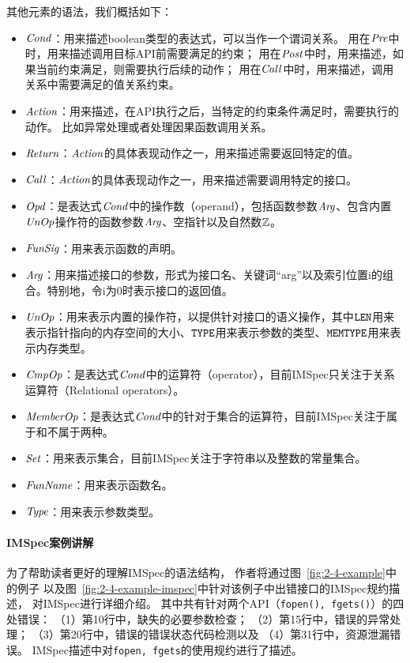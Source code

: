 

其他元素的语法，我们概括如下：
\begin{itemize}
	\item $\mathit{Cond}$：用来描述boolean类型的表达式，可以当作一个谓词关系。
	用在$\mathit{Pre}$中时，用来描述调用目标API前需要满足的约束；
	用在$\mathit{Post}$中时，用来描述，如果当前约束满足，则需要执行后续的动作；
	用在$\mathit{Call}$中时，用来描述，调用关系中需要满足的值关系约束。
	\item $\mathit{Action}$：用来描述，在API执行之后，当特定的约束条件满足时，需要执行的动作。
	比如异常处理或者处理因果函数调用关系。
	\item $\mathit{Return}$：$\mathit{Action}$的具体表现动作之一，用来描述需要返回特定的值。
	\item $\mathit{Call}$：$\mathit{Action}$的具体表现动作之一，用来描述需要调用特定的接口。
	\item $\mathit{Opd}$：是表达式$\mathit{Cond}$中的操作数（operand），包括函数参数$\mathit{Arg}$、包含内置$\mathit{UnOp}$操作符的函数参数$\mathit{Arg}$、空指针以及自然数$\mathbb{Z}$。
	\item $\mathit{FunSig}$：用来表示函数的声明。
	\item $\mathit{Arg}$：用来描述接口的参数，形式为接口名、关键词“arg”以及索引位置i的组合。特别地，令i为0时表示接口的返回值。
	\item $\mathit{UnOp}$：用来表示内置的操作符，以提供针对接口的语义操作，其中\textbf{$\texttt{LEN}$}用来表示指针指向的内存空间的大小、\textbf{$\texttt{TYPE}$}用来表示参数的类型、\textbf{$\texttt{MEMTYPE}$}用来表示内存类型。
	\item $\mathit{CmpOp}$：是表达式$\mathit{Cond}$中的运算符（operator），目前IMSpec只关注于关系运算符（Relational operators）。
	\item $\mathit{MemberOp}$：是表达式$\mathit{Cond}$中的针对于集合的运算符，目前IMSpec关注于属于和不属于两种。
	\item $\mathit{Set}$：用来表示集合，目前IMSpec关注于字符串以及整数的常量集合。
	\item $\mathit{FunName}$：用来表示函数名。
	\item $\mathit{Type}$：用来表示参数类型。
\end{itemize}



\paragraph{IMSpec案例讲解}
为了帮助读者更好的理解IMSpec的语法结构，
作者将通过图~\ref{fig:2-4-example}中的例子
以及图~\ref{fig:2-4-example-imspec}中针对该例子中出错接口的IMSpec规约描述，
对IMSpec进行详细介绍。
其中共有针对两个API（\texttt{fopen(), fgets()}）的四处错误：
（1）第10行中，缺失的必要参数检查；
（2）第15行中，错误的异常处理；
（3）第20行中，错误的错误状态代码检测以及
（4）第31行中，资源泄漏错误。
IMSpec描述中对\texttt{fopen, fgets}的使用规约进行了描述。

